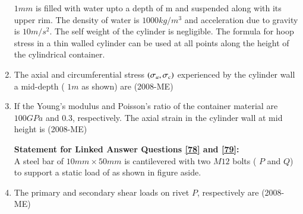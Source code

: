 \documentclass[journal]{IEEEtran}
\begin{document}
\begin{enumerate}
$1 mm$ is filled with water upto a depth of 
m and suspended along with its upper rim. The density of water is $1000kg/m^3$ and acceleration due to gravity is $10m/s^2$. The self weight of the cylinder is negligible. The formula for hoop stress in a thin walled cylinder can be used at all points along the height of the cylindrical container. \\
  
 \item The axial and circumferential stress $\left(\sigma_a, \sigma_c\right)$ experienced by the cylinder wall a mid-depth (
 $1m$ as shown) are \label{76} \hfill(2008-ME)
\begin{enumerate}
    \end{enumerate}
\item If the Young's modulus and Poisson's ratio of the container material are $100GPa$ and $0.3$, respectively. The axial strain in the cylinder wall at mid height is \label{77} \hfill(2008-ME)
\begin{enumerate}
\end{enumerate}
\textbf{Statement for Linked Answer Questions \ref{78} and \ref{79}:} \\
A steel bar of $10mm \times 50mm$
 is cantilevered with two $M12$
 bolts ( $P$ and $Q$) to support a static load of 
 as shown in figure aside.
 
 \item The primary and secondary shear loads on rivet $P$,
 respectively are \label{78} \hfill(2008-ME)
 \begin{enumerate}
\end{enumerate}
\end{enumerate}
\end{document}
